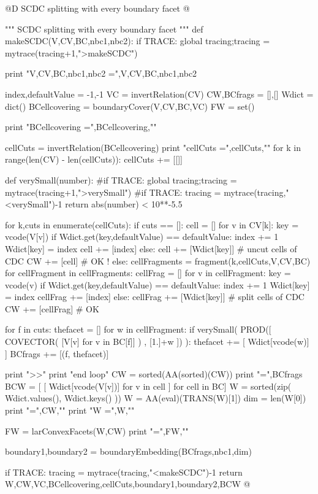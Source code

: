 \documentclass[11pt,oneside]{article}	%
\begin{document}
@D SCDC splitting with every boundary facet
@{""" SCDC splitting with every boundary facet """
def makeSCDC(V,CV,BC,nbc1,nbc2):
	if TRACE: global tracing;tracing = mytrace(tracing+1,">makeSCDC")

	print "V,CV,BC,nbc1,nbc2 =",V,CV,BC,nbc1,nbc2
		
	index,defaultValue = -1,-1
	VC = invertRelation(CV)
	CW,BCfrags = [],[]
	Wdict = dict()
	BCellcovering = boundaryCover(V,CV,BC,VC)
	FW = set()
	
	print "BCellcovering =",BCellcovering,"\n"

	cellCuts = invertRelation(BCellcovering)
	print "cellCuts =",cellCuts,"\n"
	for k in range(len(CV) - len(cellCuts)): cellCuts += [[]]

	def verySmall(number): 
		#if TRACE: global tracing;tracing = mytrace(tracing+1,">verySmall")		
		#if TRACE: tracing = mytrace(tracing,"<verySmall")-1
		return abs(number) < 10**-5.5
	
	for k,cuts in enumerate(cellCuts):
		if cuts == []:
			cell = []
			for v in CV[k]:
				key = vcode(V[v])
				if Wdict.get(key,defaultValue) == defaultValue:
					index += 1
					Wdict[key] = index
					cell += [index]
				else: 
					cell += [Wdict[key]]
			# uncut cells of CDC
			CW += [cell]  # OK !
		else:
			cellFragments = fragment(k,cellCuts,V,CV,BC)
			for cellFragment in cellFragments:
				cellFrag = []
				for v in cellFragment:
					key = vcode(v)
					if Wdict.get(key,defaultValue) == defaultValue:
						index += 1
						Wdict[key] = index
						cellFrag += [index]
					else: 
						cellFrag += [Wdict[key]]
				# split cells of CDC
				CW += [cellFrag]	  # OK

				for f in cuts:
					thefacet = []
					for w in cellFragment:
						if verySmall( PROD([ COVECTOR( [V[v] for v in BC[f]] ) , [1.]+w ]) ):
							thefacet += [ Wdict[vcode(w)] ]
					BCfrags += [(f, thefacet)]		
				
	print "\nmakeSCDC >>"
	print "end loop"
	CW = sorted(AA(sorted)(CW))
	print "\nBCfrags =",BCfrags
	BCW = [ [ Wdict[vcode(V[v])] for v in cell ] for cell in BC]
	W = sorted(zip( Wdict.values(), Wdict.keys() ))
	W = AA(eval)(TRANS(W)[1])
	dim = len(W[0])
	print "\nCW =",CW,"\n"
	print "W =",W,"\n"
	
	FW = larConvexFacets(W,CW)
	print "\nFW =",FW,"\n"
	
	boundary1,boundary2 = boundaryEmbedding(BCfrags,nbc1,dim)

	if TRACE: tracing = mytrace(tracing,"<makeSCDC")-1
	return W,CW,VC,BCellcovering,cellCuts,boundary1,boundary2,BCW
@}
\end{document}
